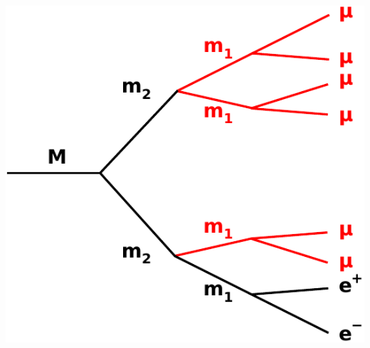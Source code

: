 \documentclass[compress]{beamer}
\begin{document}
\begin{frame}
\begin{columns}
\begin{center}
\includegraphics[width=0.7\linewidth]{basic_picture5.pdf}
\end{center}
\end{columns}
\end{frame}
\end{document}
